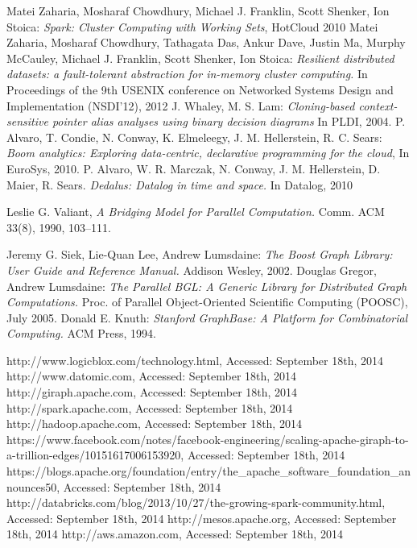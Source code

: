\documentclass{pracamgr}
\theoremstyle{plain}
\theoremstyle{definition}
\theoremstyle{remark}
\begin{document}
\begin{thebibliography}{99}
 Matei Zaharia, Mosharaf Chowdhury, Michael J. Franklin, Scott Shenker, Ion Stoica: \textit{Spark: Cluster Computing with Working Sets}, HotCloud 2010
 Matei Zaharia, Mosharaf Chowdhury, Tathagata Das, Ankur Dave, Justin Ma, Murphy McCauley, Michael J. Franklin, Scott Shenker, Ion Stoica: \textit{Resilient distributed datasets: a fault-tolerant abstraction for in-memory cluster computing.} In Proceedings of the 9th USENIX conference on Networked Systems Design and Implementation (NSDI'12), 2012
 J. Whaley, M. S. Lam: \textit{Cloning-based context-sensitive pointer alias analyses using binary decision diagrams} In PLDI, 2004.
 P. Alvaro, T. Condie, N. Conway, K. Elmeleegy, J. M. Hellerstein, R. C. Sears: \textit{Boom analytics: Exploring data-centric, declarative programming for the cloud}, In EuroSys, 2010.
 P. Alvaro, W. R. Marczak, N. Conway, J. M. Hellerstein, D. Maier, R. Sears. \textit{Dedalus: Datalog in time and space.} In Datalog, 2010

 Leslie G. Valiant, \emph{A Bridging Model for Parallel Computation.} Comm. ACM 33(8), 1990, 103–111.

 Jeremy G. Siek, Lie-Quan Lee, Andrew Lumsdaine: \textit{The Boost Graph Library: User Guide and Reference Manual.} Addison Wesley, 2002.
 Douglas Gregor, Andrew Lumsdaine: \textit{The Parallel BGL: A Generic Library for Distributed Graph Computations.} Proc. of Parallel Object-Oriented Scientific Computing (POOSC), July 2005.
 Donald E. Knuth: \textit{Stanford GraphBase: A Platform for Combinatorial Computing.} ACM Press, 1994.

 http://www.logicblox.com/technology.html, Accessed: September 18th, 2014
 http://www.datomic.com, Accessed: September 18th, 2014
 http://giraph.apache.com, Accessed: September 18th, 2014
 http://spark.apache.com, Accessed: September 18th, 2014
 http://hadoop.apache.com, Accessed: September 18th, 2014
 https://www.facebook.com/notes/facebook-engineering/scaling-apache-giraph-to-a-trillion-edges/10151617006153920, Accessed: September 18th, 2014
 https://blogs.apache.org/foundation/entry/the\_apache\_software\_foundation\_announces50, Accessed: September 18th, 2014
 http://databricks.com/blog/2013/10/27/the-growing-spark-community.html, Accessed: September 18th, 2014
 http://mesos.apache.org, Accessed: September 18th, 2014
 http://aws.amazon.com, Accessed: September 18th, 2014


\end{thebibliography}
\end{document}
